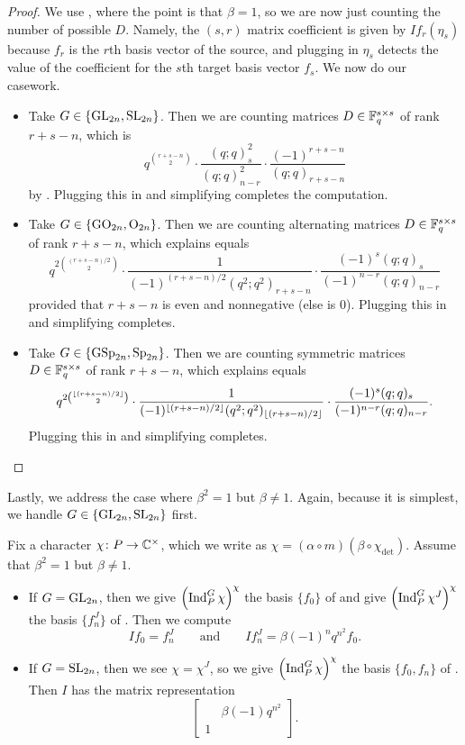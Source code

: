 \begin{proof}
	We use , where the point is that $\beta=1$, so we are now just counting the number of possible $D$. Namely, the $(s,r)$ matrix coefficient is given by $If_r(\eta_s)$ because $f_r$ is the $r$th basis vector of the source, and plugging in $\eta_s$ detects the value of the coefficient for the $s$th target basis vector $f_s$. We now do our casework.
	\begin{itemize}
		\item Take $G\in\{\mathrm{GL}_{2n},\mathrm{SL}_{2n}\}$. Then we are counting matrices $D\in\mathbb F_q^{s\times s}$ of rank $r+s-n$, which is
		\[q^{\binom{r+s-n}2}\cdot\frac{(q;q)_s^2}{(q;q)_{n-r}^2}\cdot\frac{(-1)^{r+s-n}}{(q;q)_{r+s-n}}\]
		by \cite[Theorem~7.1.5]{hach-gf}. Plugging this in and simplifying completes the computation.
		\item Take $G\in\{\mathrm{GO}_{2n},\mathrm{O}_{2n}\}$. Then we are counting alternating matrices $D\in\mathbb F_q^{s\times s}$ of rank $r+s-n$, which \cite[Theorem~7.5.5]{hach-gf} explains equals
		\[q^{2\binom{(r+s-n)/2}2}\cdot\frac{1}{(-1)^{(r+s-n)/2}(q^2;q^2)_{r+s-n}}\cdot\frac{(-1)^s(q;q)_s}{(-1)^{n-r}(q;q)_{n-r}}\]
		provided that $r+s-n$ is even and nonnegative (else is $0$). Plugging this in and simplifying completes.
		\item Take $G\in\{\mathrm{GSp}_{2n},\mathrm{Sp}_{2n}\}$. Then we are counting symmetric matrices $D\in\mathbb F_q^{s\times s}$ of rank $r+s-n$, which \cite[Theorem~7.5.2]{hach-gf} explains equals
		\[q^{2\binom{\left\lfloor{(r+s-n)/2}\right\rfloor}2}\cdot\frac{1}{(-1)^{\left\lfloor{(r+s-n)/2}\right\rfloor}(q^2;q^2)_{\left\lfloor{(r+s-n)/2}\right\rfloor}}\cdot\frac{(-1)^s(q;q)_s}{(-1)^{n-r}(q;q)_{n-r}}.\]
		Plugging this in and simplifying completes.
		\qedhere
	\end{itemize}
\end{proof}
Lastly, we address the case where $\beta^2=1$ but $\beta\ne1$. Again, because it is simplest, we handle $G\in\{\mathrm{GL}_{2n},\mathrm{SL}_{2n}\}$ first.
\begin{proposition} \label{prop:quad-gl-sl-matrix}
	Fix a character $\chi\colon P\to\mathbb C^\times$, which we write as $\chi=(\alpha\circ m)(\beta\circ\chi_{\det})$. Assume that $\beta^2=1$ but $\beta\ne1$.
	\begin{itemize}
		\item If $G=\mathrm{GL}_{2n}$, then we give $\left(\operatorname{Ind}_P^G\chi\right)^\chi$ the basis $\{f_0\}$ of  and give $\left(\operatorname{Ind}_P^G\chi^J\right)^{\chi}$ the basis $\{f_n^J\}$ of . Then we compute 
		\[If_0=f_n^J\qquad\text{and}\qquad If_n^J=\beta(-1)^nq^{n^2}f_0.\]
		\item If $G=\mathrm{SL}_{2n}$, then we see $\chi=\chi^J$, so we give $\left(\operatorname{Ind}_P^G\chi\right)^\chi$ the basis $\{f_0,f_n\}$ of . Then $I$ has the matrix representation
		\[\begin{bmatrix}
			& \beta(-1)q^{n^2} \\ 1
		\end{bmatrix}.\]
	\end{itemize}
\end{proposition}
